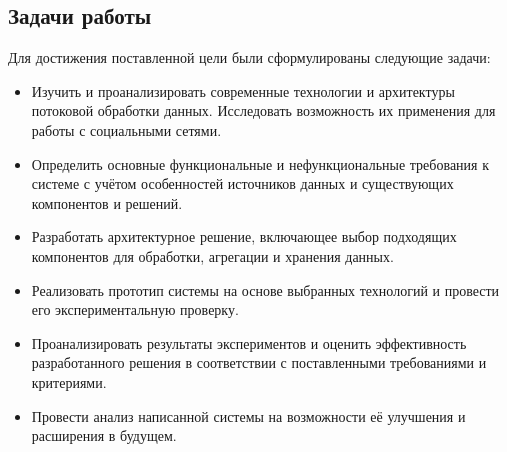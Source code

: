     \subsection{Задачи работы}
        Для достижения поставленной цели были сформулированы следующие задачи:
        \begin{itemize}
            \item Изучить и проанализировать современные технологии и архитектуры потоковой обработки данных. Исследовать возможность их применения для работы с социальными сетями.
            \item Определить основные функциональные и нефункциональные требования к системе с учётом особенностей источников данных и существующих компонентов и решений.
            \item Разработать архитектурное решение, включающее выбор подходящих компонентов для обработки, агрегации и хранения данных.
            \item Реализовать прототип системы на основе выбранных технологий и провести его экспериментальную проверку.
            \item Проанализировать результаты экспериментов и оценить эффективность разработанного решения в соответствии с поставленными требованиями и критериями.
            \item Провести анализ написанной системы на возможности её улучшения и расширения в будущем.
        \end{itemize}

\newpage
